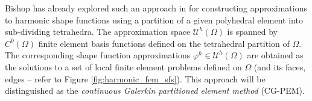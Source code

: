 %
	
	Bishop has already explored such an approach in \cite{Bishop:14} for constructing approximations to harmonic shape functions using a partition of a given polyhedral element into sub-dividing tetrahedra. The approximation space $\mathcal{U}^h (\Omega)$ is spanned by $C^0 (\Omega)$ finite element basis functions defined on the tetrahedral partition of $\Omega$. The corresponding shape function approximations $\varphi^h \in \mathcal{U}^h (\Omega)$ are obtained as the solutions to a set of local finite element problems defined on $\Omega$ (and its faces, edges -- refer to Figure \ref{fig:harmonic_fem_sfs}). This approach will be distinguished as the \textit{continuous Galerkin partitioned element method} (CG-PEM).
	
